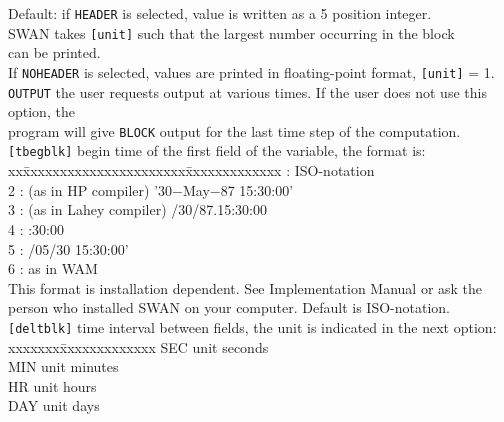 \documentclass[12pt]{book}
\begin{document}
\begin{tabbing}
                Default: if {\tt HEADER} is selected, value is written as a 5 position integer.\\
                SWAN takes {\tt [unit]} such that the largest number occurring in the block\\
                can be printed.\\
                If {\tt NOHEADER} is selected, values are printed in floating-point format, {\tt [unit]} = 1.\-\\
{\tt OUTPUT} \> the user requests output at various times. If the user does not use this option, the\+\\
                program will give {\tt BLOCK} output for the last time step of the computation.\-\\
{\tt [tbegblk]}     \> begin time of the first field of the variable, the format is:\+\\
                       \pushtabs
                       xx\=xxxxxxxxxxxxxxxxxxxxxx\=xxxxxxxxxxxxx  \>: ISO-notation                     \\
                       2 \>: (as in HP compiler)    \> '30$-$May$-$87 15:30:00' \\
                       3 \>: (as in Lahey compiler) /30/87.15:30:00        \\
                       4 \>:                        :30:00                 \\
                       5 \>:                        /05/30 15:30:00'       \\
                       6 \>: as in WAM                             \\
                       \poptabs
                       This format is installation dependent. See Implementation Manual or ask the\\
                       person who installed SWAN on your computer. Default is ISO-notation.\-\\
{\tt [deltblk]}     \> time interval between fields, the unit is indicated in the next option:\+\\
                       \pushtabs
                       xxxxxxx\=xxxxxxxxxxxxx \kill
                       SEC \> unit seconds\\
                       MIN \> unit minutes\\
                       HR  \> unit hours\\
                       DAY \> unit days\-\\
                       \poptabs
\end{tabbing}
\end{document}
